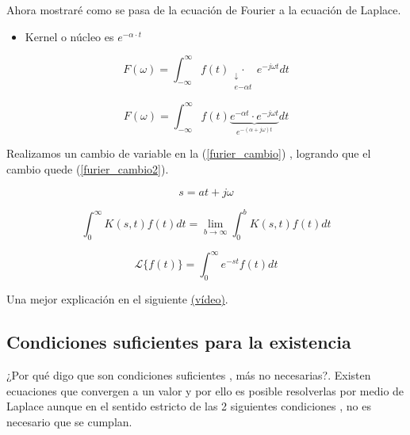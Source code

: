 Ahora mostraré como se pasa de la ecuación de Fourier a la ecuación de Laplace.

\begin{itemize}
	\item Kernel o núcleo es  $ e^{-\alpha \cdot t} $
\end{itemize}


\begin{equation}
		F(\omega)= \int^{\infty}_{- \infty} f(t)
	\underset{\substack{\downarrow \\ e{- \alpha t}}}{\cdot}
	e^{- j \omega t} dt
\end{equation}

\begin{equation}
	F(\omega)= \int^{\infty}_{- \infty} f(t)
	\underbrace{e^{- \alpha t} \cdot e^{- j \omega t}}_{e^{- (\alpha + j \omega)t}} dt 
	\label{furier_cambio}
\end{equation}

Realizamos un cambio de  variable  en la (\ref{furier_cambio}) , logrando que el cambio quede (\ref{furier_cambio2}).

\begin{equation}
	s= at + j \omega
	\label{furier_cambio2}
\end{equation}

\begin{equation}
	\int_{0}^{\infty} K(s, t) f(t) d t=\lim _{b \rightarrow \infty} \int_{0}^{b} K(s, t) f(t) d t
\end{equation}


\begin{equation}
	\mathscr{L}\{f(t)\}=\int_{0}^{\infty} e^{-s t} f(t) d t
\end{equation}

Una mejor explicación en el siguiente  \href{https://www.youtube.com/watch?v=i1wRqo\_2zgw}{(vídeo)}.

\subsection{Condiciones suficientes para la existencia}

¿Por qué digo que son condiciones suficientes , más no necesarias?. Existen ecuaciones que convergen a un valor y por ello es posible resolverlas por medio de Laplace aunque en el sentido estricto de las 2 siguientes condiciones , no es necesario que se cumplan.

